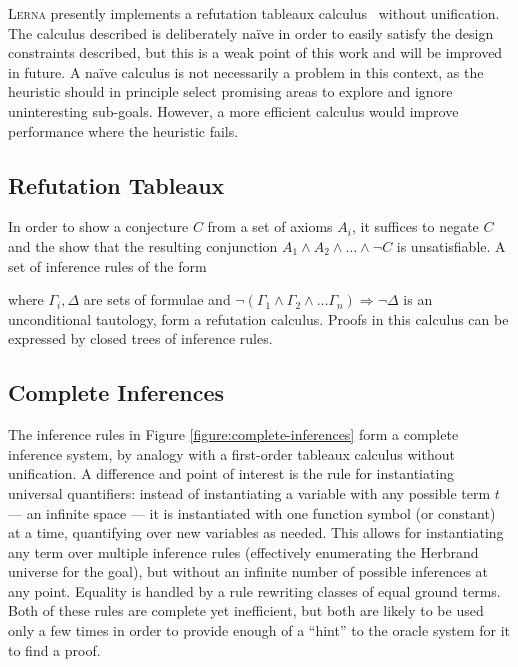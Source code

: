 \documentclass[runningheads]{llncs}
\newcommand{\lerna}{\textsc{Lerna}}
\begin{document}
\lerna{} presently implements a refutation tableaux calculus~\cite{handbook-of-automated-reasoning} without unification.
The calculus described is deliberately na\"ive in order to easily satisfy the design constraints described, but this is a weak point of this work and will be improved in future.
A na\"ive calculus is not necessarily a problem in this context, as the heuristic should in principle select promising areas to explore and ignore uninteresting sub-goals.
However, a more efficient calculus would improve performance where the heuristic fails.

\subsection{Refutation Tableaux}
In order to show a conjecture \(C\) from a set of axioms \(A_i\), it suffices to negate \(C\) and the show that the resulting conjunction \(A_1 \wedge A_2 \wedge \ldots \wedge \lnot C\) is unsatisfiable.
A set of inference rules of the form
\begin{mathpar}
\end{mathpar}
where \(\Gamma_i, \Delta\) are sets of formulae and \(\lnot\left(\Gamma_1 \wedge \Gamma_2 \wedge \ldots \Gamma_n\right) \Rightarrow \lnot \Delta\) is an unconditional tautology, form a refutation calculus.
Proofs in this calculus can be expressed by closed trees of inference rules.

\subsection{Complete Inferences}
The inference rules in Figure \ref{figure:complete-inferences} form a complete inference system, by analogy with a first-order tableaux calculus without unification.
A difference and point of interest is the rule for instantiating universal quantifiers: instead of instantiating a variable with any possible term \(t\) --- an infinite space --- it is instantiated with one function symbol (or constant) at a time, quantifying over new variables as needed.
This allows for instantiating any term over multiple inference rules (effectively enumerating the Herbrand universe for the goal), but without an infinite number of possible inferences at any point.
Equality is handled by a rule rewriting classes of equal ground terms.
Both of these rules are complete yet inefficient, but both are likely to be used only a few times in order to provide enough of a ``hint'' to the oracle system for it to find a proof.
\end{document}
